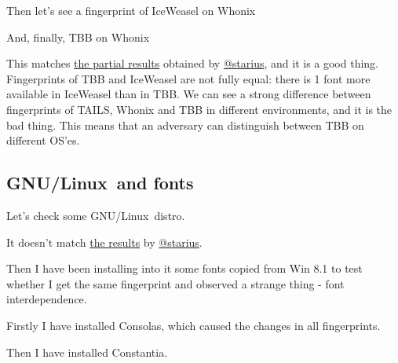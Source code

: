 \documentclass[letterpaper,14pt]{article}
\begin{document}


Then let's see a fingerprint of IceWeasel on Whonix



And, finally, TBB on Whonix



This matches \href{https://geektimes.ru/post/244484/\#comment_8227810}{the partial results} obtained by \href{https://geektimes.ru/users/starius/}{@starius}, and it is a good thing. Fingerprints of TBB and IceWeasel are not fully equal: there is 1 font more available in IceWeasel than in TBB. We can see a strong difference between fingerprints of TAILS, Whonix and TBB in different environments, and it is the bad thing. This means that an adversary can distinguish between TBB on different OS'es.

\subsection{GNU/Linux\texttrademark\ and fonts}\label{linux-and-fonts}

Let's check some GNU/Linux\texttrademark\ distro.



It doesn't match \href{https://geektimes.ru/post/244484/\#comment_8227810}{the results} by \href{https://geektimes.ru/users/starius/}{@starius}.

Then I have been installing into it some fonts copied from Win 8.1 to test whether I get the same fingerprint and observed a strange thing - font interdependence.

Firstly I have installed Consolas\texttrademark, which caused the changes in all fingerprints.



Then I have installed Constantia\texttrademark.


\end{document}
